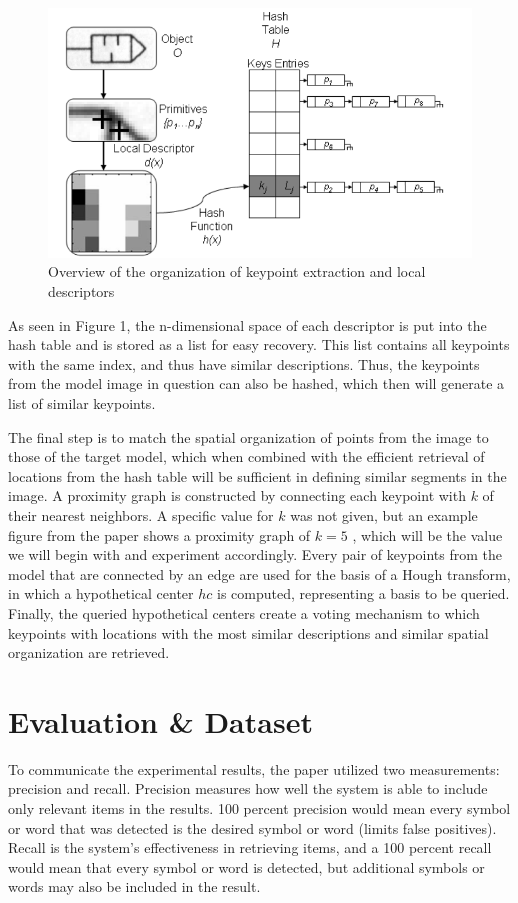 \documentclass[conference]{IEEEtran}
\begin{document}
\begin{figure}[htbp]
	\centerline{\includegraphics[width=0.8\columnwidth]{fig1.png}}
	\caption{Overview of the organization of keypoint extraction and local descriptors \cite{b1}}
	\label{Figure 1}
\end{figure}

As seen in Figure 1, the n-dimensional space of each descriptor is put into the hash table and is stored as a list for easy recovery. This list contains all keypoints with the same index, and thus have similar descriptions. Thus, the keypoints from the model image in question can also be hashed, which then will generate a list of similar keypoints.

The final step is to match the spatial organization of points from the image to those of the target model, which when combined with the efficient retrieval of locations from the hash table will be sufficient in defining similar segments in the image. A proximity graph is constructed by connecting each keypoint with $k$ of their nearest neighbors. A specific value for $k$ was not given, but an example figure from the paper shows a proximity graph of $k=5$ \cite{b1}, which will be the value we will begin with and experiment accordingly. Every pair of keypoints from the model that are connected by an edge are used for the basis of a Hough transform, in which a hypothetical center $hc$ is computed, representing a basis to be queried. Finally, the queried hypothetical centers create a voting mechanism to which keypoints with locations with the most similar descriptions and similar spatial organization are retrieved.

\section{Evaluation \& Dataset}

To communicate the experimental results, the paper utilized two measurements: precision and recall. Precision measures how well the system is able to include only relevant items in the results. 100 percent precision would mean every symbol or word that was detected is the desired symbol or word (limits false positives). Recall is the system's effectiveness in retrieving items, and a 100 percent recall would mean that every symbol or word is detected, but additional symbols or words may also be included in the result. 
\end{document}
